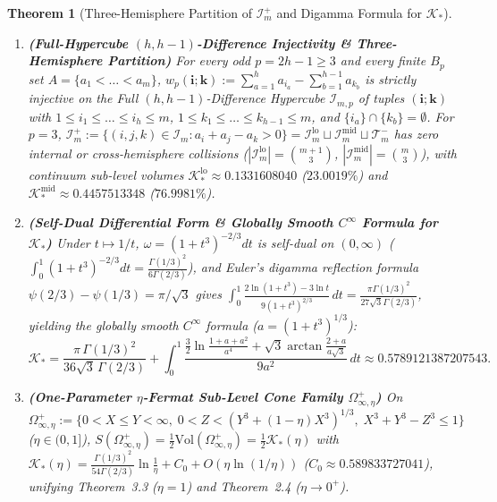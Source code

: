 \documentclass[11pt,a4paper]{article}
\newtheorem{theorem}{Theorem}[section]
\theoremstyle{remark}
\begin{document}
\begin{theorem}[Three-Hemisphere Partition of $\mathcal{I}_m^+$ and Digamma Formula for $\mathcal{K}_*$]
\begin{enumerate}
  \item \textbf{(Full-Hypercube $(h, h-1)$-Difference Injectivity \& Three-Hemisphere Partition)} For every odd $p = 2h - 1 \ge 3$ and every finite $B_p$ set $A = \{a_1 < \dots < a_m\}$, $w_p(\mathbf{i}; \mathbf{k}) := \sum_{a=1}^h a_{i_a} - \sum_{b=1}^{h-1} a_{k_b}$ is strictly injective on the Full $(h, h-1)$-Difference Hypercube $\mathcal{I}_{m, p}$ of tuples $(\mathbf{i}; \mathbf{k})$ with $1 \le i_1 \le \dots \le i_h \le m$, $1 \le k_1 \le \dots \le k_{h-1} \le m$, and $\{i_a\} \cap \{k_b\} = \emptyset$. For $p = 3$, $\mathcal{I}_m^+ := \{(i, j, k) \in \mathcal{I}_m : a_i + a_j - a_k > 0\} = \mathcal{I}_m^{\mathrm{lo}} \sqcup \mathcal{I}_m^{\mathrm{mid}} \sqcup \mathcal{T}_m^-$ has zero internal or cross-hemisphere collisions ($|\mathcal{I}_m^{\mathrm{lo}}| = \binom{m+1}{3}$, $|\mathcal{I}_m^{\mathrm{mid}}| = \binom{m}{3}$), with continuum sub-level volumes $\mathcal{K}_*^{\mathrm{lo}} \approx 0.1331608040$ ($23.0019\%$) and $\mathcal{K}_*^{\mathrm{mid}} \approx 0.4457513348$ ($76.9981\%$).
  \item \textbf{(Self-Dual Differential Form \& Globally Smooth $C^\infty$ Formula for $\mathcal{K}_*$)} Under $t \mapsto 1/t$, $\omega = (1+t^3)^{-2/3}dt$ is self-dual on $(0, \infty)$ ($\int_0^1 (1+t^3)^{-2/3}dt = \frac{\Gamma(1/3)^2}{6\Gamma(2/3)}$), and Euler's digamma reflection formula $\psi(2/3) - \psi(1/3) = \pi/\sqrt{3}$ gives $\int_0^1 \frac{2\ln(1+t^3)-3\ln t}{9(1+t^3)^{2/3}}\,dt = \frac{\pi\Gamma(1/3)^2}{27\sqrt{3}\Gamma(2/3)}$, yielding the globally smooth $C^\infty$ formula ($a = (1+t^3)^{1/3}$):
  \[
    \mathcal{K}_* = \frac{\pi\,\Gamma(1/3)^2}{36\sqrt{3}\,\Gamma(2/3)} + \int_0^1 \frac{\frac{3}{2}\ln\frac{1 + a + a^2}{a^4} + \sqrt{3}\arctan\frac{2 + a}{a\sqrt{3}}}{9 a^2}\,dt \approx 0.5789121387207543.
  \]
  \item \textbf{(One-Parameter $\eta$-Fermat Sub-Level Cone Family $\Omega_{\infty, \eta}^+$)} On $\Omega_{\infty, \eta}^+ := \{0 < X \le Y < \infty,\; 0 < Z < (Y^3 + (1-\eta)X^3)^{1/3},\; X^3 + Y^3 - Z^3 \le 1\}$ ($\eta \in (0, 1]$), $S(\Omega_{\infty, \eta}^+) = \frac{1}{2}\mathrm{Vol}(\Omega_{\infty, \eta}^+) = \frac{1}{2}\mathcal{K}_*(\eta)$ with $\mathcal{K}_*(\eta) = \frac{\Gamma(1/3)^2}{54\Gamma(2/3)}\ln\frac{1}{\eta} + C_0 + O(\eta\ln(1/\eta))$ ($C_0 \approx 0.589833727041$), unifying Theorem~3.3 ($\eta = 1$) and Theorem~2.4 ($\eta \to 0^+$).
\end{enumerate}
\end{theorem}
\end{document}
